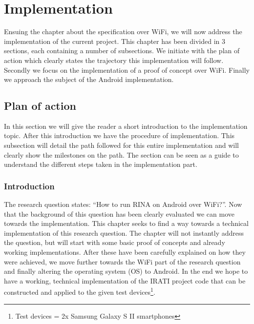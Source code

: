 \chapter{Implementation}

Ensuing the chapter about the specification over WiFi, we will now address the implementation of the current project. This chapter has been divided in 3 sections, each containing a number of subsections. We initiate with the plan of action which clearly states the trajectory this implementation will follow. Secondly we focus on the implementation of a proof of concept over WiFi. Finally we approach the subject of the Android implementation. 

\section{Plan of action}


In this section we will give the reader a short introduction to the implementation topic. After this introduction we have the procedure of implementation. This subsection will detail the path followed for this entire implementation and will clearly show the milestones on the path. The section can be seen as a guide to understand the different steps taken in the implementation part. 

\subsection{Introduction}


The research question states: ``How to run RINA on Android over WiFi?''. Now that the background of this question has been clearly evaluated we can move towards the implementation. This chapter seeks to find a way towards a technical implementation of this research question. The chapter will not instantly address the question, but will start with some basic proof of concepts and already working implementations. After these have been carefully explained on how they were achieved, we move further towards the WiFi part of the research question and finally altering the operating system (OS) to Android. 
\npar
In the end we hope to have a working, technical implementation of the IRATI project code that can be constructed and applied to the given test devices\footnote{Test devices = 2x Samsung Galaxy S II smartphones}.

